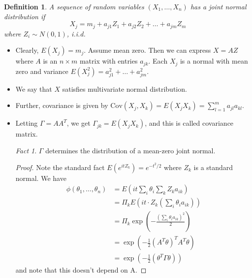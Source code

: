 \documentclass[11pt,reqno]{amsart}
\newtheorem{definition}{Definition}
\theoremstyle{remark}
\newtheorem{fact}{Fact}
\begin{document}
\begin{definition}
A sequence of random variables \( (X_1, \ldots, X_n) \) has a joint normal distribution if
\[
X_j = m_j + a_{j1}Z_1 + a_{j2}Z_2 + \ldots + a_{jm}Z_m
\]
where \( Z_i \sim N(0, 1) \), i.i.d.
\end{definition}
\begin{itemize}
\item Clearly, \( E(X_j) = m_j \). Assume mean zero. Then we can express \( X = AZ \) where \( A \) is an \( n \times m \) 
matrix with entries \( a_{jk} \). Each \( X_j \) is a normal with mean zero and 
variance \( E(X_j^2) = a_{j1}^2 + \ldots + a_{jm}^2 \).
\item We say that $X$ satisfies multivariate normal distribution.
\item Further, covariance is given by \( \text{Cov}(X_j, X_k) = E(X_jX_k) = \sum_{l=1}^{m} a_{jl}a_{kl} \).
\item Letting \( \Gamma = AA^T \), we get \( \Gamma_{jk} = E(X_jX_k) \), and this is called covariance matrix.
\begin{fact}
$\Gamma$ determines the distribution of a mean-zero joint normal.
\end{fact}
\begin{proof}
Note the standard fact $E(e^{itZ_k})=e^{-t^2/2}$ where $Z_k$ is a standard normal.
We have \begin{align}
\phi(\theta_1,\dots,\theta_n) &= E(it\sum_i\theta_i\sum_k Z_k a_{ik}) \\
&= \Pi_k E(it\cdot Z_k (\sum_i\theta_i a_{ik})) \\
&= \Pi_k \exp(-\frac{(\sum_i \theta_i a_{ik})^2}{2}) \\
&= \exp(-\frac 12 (A^T\theta)^T A^T\theta) \\
&= \exp(-\frac 12 (\theta^T \Gamma \theta)) 
\end{align} and note that this doesn't depend on A.
\end{proof}
\end{itemize}
\end{document}
